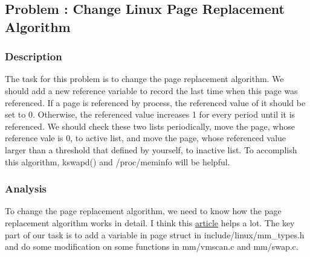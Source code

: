 \documentclass[12pt,a4paper,UTF8]{article}
\theoremstyle{definition}
\numberwithin{equation}{section}
\numberwithin{figure}{section}
\begin{document}
\subsection{Problem \uppercase\expandafter{}: Change Linux Page Replacement Algorithm}
\subsubsection{Description}
The task for this problem is to change the page replacement algorithm. We should add a new reference variable to record the last time when this page was referenced. If a page is referenced by process, the referenced value of it should be set to 0. Otherwise, the
referenced value increases 1 for every period until it is referenced. We should check
these two lists periodically, move the page, whose reference vale is 0, to active list, and
move the page, whose referenced value larger than a threshold that defined by yourself,
to inactive list. To accomplish this algorithm, {\color{cyan}\bashfont kswapd()} and {\color{blue}/proc/meminfo} will be helpful.
\subsubsection{Analysis}
To change the page replacement algorithm, we need to know how the page replacement algorithm works in detail. I think this \href{http://blog.csdn.net/zouxiaoting/article/details/8824896}{article} helps a lot. The key part of our task is to add a variable in page struct in {\color{blue}include/linux/mm\_types.h} and do some modification on some functions in {\color{blue}mm/vmscan.c} and {\color{blue}mm/swap.c}.
\end{document}
